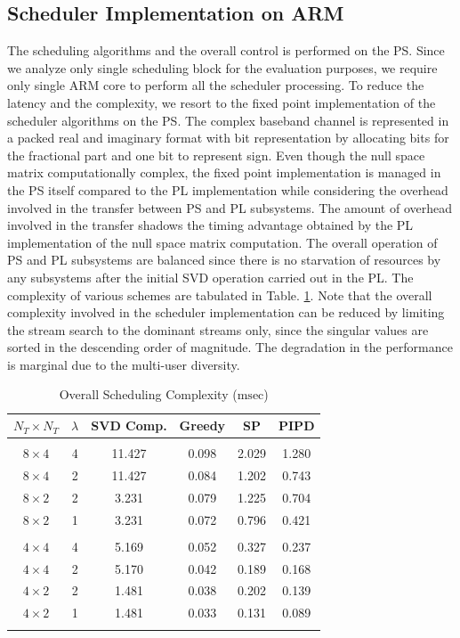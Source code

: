 \documentclass[conference,letterpaper,10pt]{./../../IEEE/IEEEtran}
\begin{document}
\subsection{Scheduler Implementation on ARM}
The scheduling algorithms and the overall control is performed on the PS. Since we analyze only single scheduling block for the evaluation purposes, we require only single ARM core to perform all the scheduler processing. To reduce the latency and the complexity, we resort to the fixed point implementation of the scheduler algorithms on the PS. The complex baseband channel is represented in a packed real and imaginary format with  bit representation by allocating  bits for the fractional part and one bit to represent sign. Even though the null space matrix computationally complex, the fixed point implementation is managed in the PS itself compared to the PL implementation while considering the overhead involved in the transfer between PS and PL subsystems. The amount of overhead involved in the transfer shadows the timing advantage obtained by the PL implementation of the null space matrix computation. The overall operation of PS and PL subsystems are balanced since there is no starvation of resources by any subsystems after the initial SVD operation carried out in the PL. The complexity of various schemes are tabulated in Table. \ref{table:compexity_comparison}. Note that the overall complexity involved in the scheduler implementation can be reduced by limiting the stream search to the dominant streams only, since the singular values are sorted in the descending order of magnitude. The degradation in the performance is marginal due to the multi-user diversity.
\begin{table} \caption{Overall Scheduling Complexity ($\mathrm{msec}$)} \begin{center} \begin{tabular}{c c c c c c}
$N_T \times N_T $ & $\lambda$ & SVD Comp. & Greedy   & SP          & PIPD \\ 
\hline \\
$8 \times 4$ & 4 & 11.427 & 0.098 & 2.029 & 1.280 \\ 
$8 \times 4$ & 2 & 11.427 & 0.084 & 1.202 & 0.743 \\
$8 \times 2$ & 2 & 3.231 & 0.079 & 1.225 & 0.704 \\
$8 \times 2$ & 1 & 3.231 & 0.072 & 0.796 & 0.421 \\
\hline \\
$4 \times 4$ & 4 & 5.169 & 0.052 & 0.327 & 0.237 \\ 
$4 \times 4$ & 2 & 5.170 & 0.042 & 0.189 & 0.168 \\
$4 \times 2$ & 2 & 1.481 & 0.038 & 0.202 & 0.139 \\
$4 \times 2$ & 1 & 1.481 & 0.033 & 0.131 & 0.089 \\
\hline \vspace{-0.25in}
\end{tabular} \label{table:compexity_comparison}\end{center}\end{table}
\end{document}
